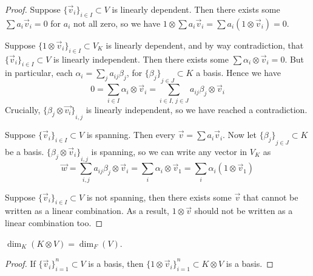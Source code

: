 \begin{proof}
    Suppose \({\{\vec{v}_i\}}_{i \in I} \subset V\) is linearly dependent.
    Then there exists some \(\sum a_i\vec{v}_i = 0\) for \(a_i\) not all zero,
    so we have \(1 \otimes \sum a_i\vec{v}_i = \sum a_i(1\otimes\vec{v}_i) = 0\).

    Suppose \({\{1\otimes\vec{v}_i\}}_{i \in I} \subset V_K\) is linearly dependent,
    and by way contradiction, that \({\{\vec{v}_i\}}_{i \in I} \subset V\) is linearly independent.
    Then there exists some \(\sum \alpha_i\otimes\vec{v}_i = 0\).
    But in particular, each \(\alpha_i = \sum_j a_{ij}\beta_j\),
    for \({\{\beta_j\}}_{j \in J} \subset K\) a basis.
    Hence we have
    \begin{equation*}
        0 = \sum_{i \in I} \alpha_i \otimes\vec{v}_i
        = \sum_{i \in I,\,j \in J} a_{ij} \beta_j \otimes \vec{v}_i
    \end{equation*}
    Crucially, \({\{\beta_j \otimes \vec{v_i}\}}_{i,j}\) is linearly independent,
    so we have reached a contradiction.

    Suppose \({\{\vec{v}_i\}}_{i \in I} \subset V\) is spanning.
    Then every \(\vec{v} = \sum a_i\vec{v}_i\).
    Now let \({\{\beta_j\}}_{j \in J} \subset K\) be a basis.
    \({\{\beta_j\otimes\vec{v}_i\}}_{i,j}\) is spanning,
    so we can write any vector in \(V_K\) as
    \begin{equation*}
        \vec{w} = \sum_{i,j} a_{ij}\beta_j \otimes \vec{v}_i
        = \sum_i \alpha_i \otimes \vec{v}_1
        = \sum_i \alpha_i (1\otimes\vec{v}_1)
    \end{equation*}

    Suppose \({\{\vec{v}_i\}}_{i \in I} \subset V\) is not spanning,
    then there exists some \(\vec{v}\) that cannot be written as a linear combination.
    As a result, \(1 \otimes \vec{v}\) should not be written as a linear combination too.
\end{proof}
\begin{corollary}
    \(\dim_K(K \otimes V) = \dim_F(V)\).
\end{corollary}
\begin{proof}
    If \({\{\vec{v}_i\}}_{i=1}^n \subset V\) is a basis,
    then \({\{1\otimes\vec{v}_i\}}_{i=1}^n \subset K \otimes V\) is a basis.
\end{proof}

